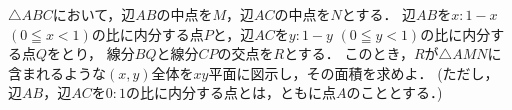 \documentclass[../../main.tex]{subfiles}
\begin{document}
$\triangle ABC$において，辺$AB$の中点を$M$，辺$AC$の中点を$N$とする．
辺$AB$を$x:1-x$ $(0 \leqq x < 1)$の比に内分する点$P$と，辺$AC$を$y:1-y$ $(0 \leqq y < 1)$の比に内分する点$Q$をとり，
線分$BQ$と線分$CP$の交点を$R$とする．
このとき，$R$が$\triangle AMN$に含まれるような$(x,y)$全体を$xy$平面に図示し，その面積を求めよ．
(ただし，辺$AB$，辺$AC$を$0:1$の比に内分する点とは，ともに点$A$のこととする．)
\end{document}
